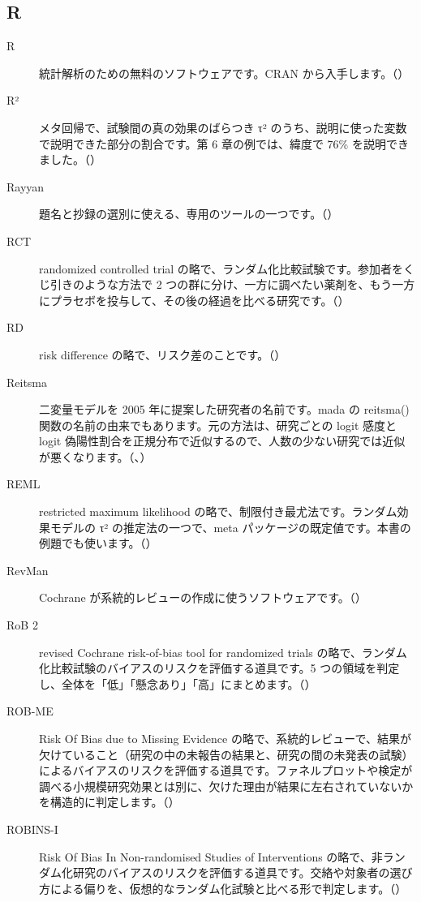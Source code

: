\subsection*{R}
\begin{description}
\item[R] 統計解析のための無料のソフトウェアです。CRAN から入手します。（）
\item[R²] メタ回帰で、試験間の真の効果のばらつき τ² のうち、説明に使った変数で説明できた部分の割合です。第 6 章の例では、緯度で 76\% を説明できました。（）
\item[Rayyan] 題名と抄録の選別に使える、専用のツールの一つです。（）
\item[RCT] randomized controlled trial の略で、ランダム化比較試験です。参加者をくじ引きのような方法で 2 つの群に分け、一方に調べたい薬剤を、もう一方にプラセボを投与して、その後の経過を比べる研究です。（）
\item[RD] risk difference の略で、リスク差のことです。（）
\item[Reitsma] 二変量モデルを 2005 年に提案した研究者の名前です。mada の reitsma() 関数の名前の由来でもあります。元の方法は、研究ごとの logit 感度と logit 偽陽性割合を正規分布で近似するので、人数の少ない研究では近似が悪くなります。（、）
\item[REML] restricted maximum likelihood の略で、制限付き最尤法です。ランダム効果モデルの τ² の推定法の一つで、meta パッケージの既定値です。本書の例題でも使います。（）
\item[RevMan] Cochrane が系統的レビューの作成に使うソフトウェアです。（）
\item[RoB 2] revised Cochrane risk-of-bias tool for randomized trials の略で、ランダム化比較試験のバイアスのリスクを評価する道具です。5 つの領域を判定し、全体を「低」「懸念あり」「高」にまとめます。（）
\item[ROB-ME] Risk Of Bias due to Missing Evidence の略で、系統的レビューで、結果が欠けていること（研究の中の未報告の結果と、研究の間の未発表の試験）によるバイアスのリスクを評価する道具です。ファネルプロットや検定が調べる小規模研究効果とは別に、欠けた理由が結果に左右されていないかを構造的に判定します。（）
\item[ROBINS-I] Risk Of Bias In Non-randomised Studies of Interventions の略で、非ランダム化研究のバイアスのリスクを評価する道具です。交絡や対象者の選び方による偏りを、仮想的なランダム化試験と比べる形で判定します。（）

\end{description}
